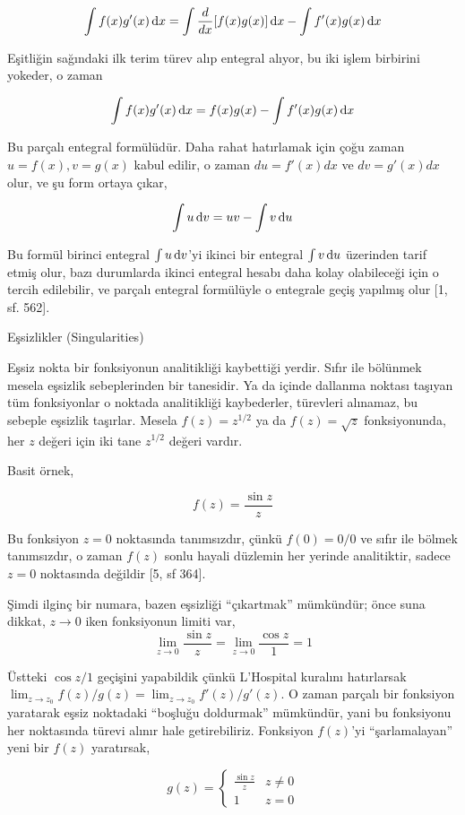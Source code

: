 \documentclass[12pt,fleqn]{article}\usepackage{../../common}
\begin{document}
$$
\int f(x)g'(x) \,\mathrm{d} x = \int \frac{d}{dx}[f(x)g(x)] \,\mathrm{d} x - \int f'(x)g(x) \,\mathrm{d} x
$$

Eşitliğin sağındaki ilk terim türev alıp entegral alıyor, bu iki işlem
birbirini yokeder, o zaman 

$$ \int f(x)g'(x) \,\mathrm{d} x = f(x)g(x) - \int f'(x)g(x) \,\mathrm{d} x$$

Bu parçalı entegral formülüdür. Daha rahat hatırlamak için çoğu zaman
$u=f(x),v=g(x)$ kabul edilir, o zaman $du = f'(x)dx$ ve $dv = g'(x)dx$
olur, ve şu form ortaya çıkar,

$$ \int u \,\mathrm{d} v = uv - \int v \,\mathrm{d} u$$

Bu formül birinci entegral $\int u \,\mathrm{d} v$'yi ikinci bir entegral $\int v \,\mathrm{d} u$
üzerinden tarif etmiş olur, bazı durumlarda ikinci entegral hesabı daha kolay
olabileceği için o tercih edilebilir, ve parçalı entegral formülüyle o entegrale
geçiş yapılmış olur [1, sf. 562].

\newpage

Eşsizlikler (Singularities) 

Eşsiz nokta bir fonksiyonun analitikliği kaybettiği yerdir. Sıfır ile
bölünmek mesela eşsizlik sebeplerinden bir tanesidir. Ya da içinde dallanma
noktası taşıyan tüm fonksiyonlar o noktada analitikliği kaybederler,
türevleri alınamaz, bu sebeple eşsizlik taşırlar. Mesela $f(z) = z^{1/2}$
ya da $f(z) = \sqrt{z}$ fonksiyonunda, her $z$ değeri için iki tane
$z^{1/2}$ değeri vardır.

Basit örnek, 

$$ f(z) = \frac{ \sin z}{z} $$

Bu fonksiyon $z=0$ noktasında tanımsızdır, çünkü $f(0) = 0/0$ ve sıfır ile
bölmek tanımsızdır, o zaman $f(z)$ sonlu hayali düzlemin her yerinde
analitiktir, sadece $z=0$ noktasında değildir [5, sf 364]. 

Şimdi ilginç bir numara, bazen eşsizliği ``çıkartmak'' mümkündür; önce suna
dikkat, $z \to 0$ iken fonksiyonun limiti var,
$$ \lim_{z \to 0} \frac{ \sin z}{z} = \lim_{z \to 0} \frac{\cos z}{1} = 1 $$


Üstteki $\cos z/1$ geçişini yapabildik çünkü L'Hospital kuralını
hatırlarsak $\lim_{z \to z_0} f(z)/g(z) = \lim_{z \to z_0} f'(z)/g'(z)$. O
zaman parçalı bir fonksiyon yaratarak eşsiz noktadaki ``boşluğu doldurmak''
mümkündür, yani bu fonksiyonu her noktasında türevi alınır hale
getirebiliriz. Fonksiyon $f(z)$'yi ``şarlamalayan'' yeni bir $f(z)$
yaratırsak,

$$ 
g(z) = \left\{ \begin{array}{ll}
\frac{\sin z}{z} & z \ne 0 \\
1 & z = 0
\end{array} \right.
 $$
\end{document}
